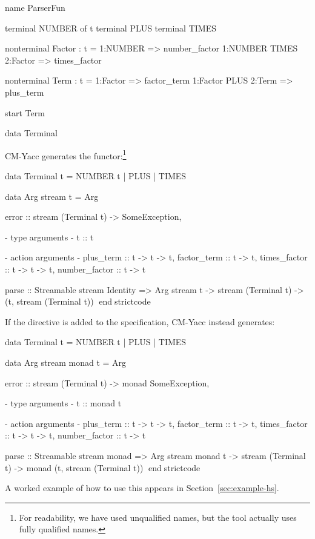 \documentclass[10pt]{article}
\begin{document}
\begin{strictcode}
\begin{strictcode}
\begin{strictcode}
\begin{strictcode}
\begin{strictcode}
\begin{code}
name ParserFun

terminal NUMBER of t
terminal PLUS
terminal TIMES

nonterminal Factor : t =
  1:NUMBER => number_factor
  1:NUMBER TIMES 2:Factor => times_factor

nonterminal Term : t =
  1:Factor => factor_term
  1:Factor PLUS 2:Term => plus_term

start Term

data Terminal
\end{code}

CM-Yacc generates the functor:\footnote{For readability, we have
used unqualified names, but the tool actually uses fully qualified names.}

\begin{strictcode}
data Terminal t =
   NUMBER t
 | PLUS
 | TIMES

data Arg stream t =
   Arg { error :: stream (Terminal t) -> SomeException,

         {- type arguments -}
         t :: t

         {- action arguments -}
         plus_term :: t -> t -> t,
         factor_term :: t -> t,
         times_factor :: t -> t -> t,
         number_factor :: t -> t }

parse :: Streamable stream Identity 
         => Arg stream t -> stream (Terminal t) -> (t, stream (Terminal t))
endstrictcode

If the  directive is added to the specification, CM-Yacc
instead generates:

\begin{strictcode}
data Terminal t =
   NUMBER t
 | PLUS
 | TIMES

data Arg stream monad t =
   Arg { error :: stream (Terminal t) -> monad SomeException,

         {- type arguments -}
         t :: monad t

         {- action arguments -}
         plus_term :: t -> t -> t,
         factor_term :: t -> t,
         times_factor :: t -> t -> t,
         number_factor :: t -> t }

parse :: Streamable stream monad 
         => Arg stream monad t 
               -> stream (Terminal t) -> monad (t, stream (Terminal t))
endstrictcode

A worked example of how to use this appears in
Section~\ref{sec:example-hs}.




\end{strictcode}
\end{strictcode}
\end{strictcode}
\end{strictcode}
\end{strictcode}
\end{strictcode}
\end{strictcode}
\end{document}
